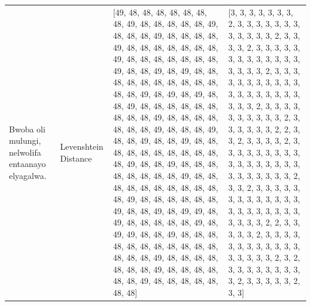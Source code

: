 \begin{tabular}{llll}
\multirow[t]{4}{*}{Bwoba oli mulungi, nelwolifa entaanayo elyagalwa.} & Levenshtein Distance & [49, 48, 48, 48, 48, 48, 48, 48, 49, 48, 48, 48, 48, 48, 49, 48, 48, 48, 49, 48, 48, 48, 48, 49, 48, 48, 48, 48, 48, 48, 48, 49, 48, 48, 48, 48, 48, 48, 48, 49, 48, 48, 49, 48, 49, 48, 48, 48, 48, 48, 48, 48, 48, 48, 48, 48, 48, 49, 48, 49, 48, 49, 48, 48, 49, 48, 48, 48, 48, 48, 48, 48, 48, 48, 49, 48, 48, 48, 48, 48, 48, 48, 49, 48, 48, 48, 49, 48, 48, 49, 48, 48, 49, 48, 48, 48, 48, 48, 48, 48, 48, 48, 48, 48, 49, 48, 48, 49, 48, 48, 48, 48, 48, 48, 48, 48, 49, 48, 48, 48, 48, 48, 48, 48, 48, 48, 48, 48, 49, 48, 48, 48, 48, 48, 48, 49, 48, 48, 49, 48, 49, 49, 48, 49, 48, 48, 48, 48, 48, 49, 48, 49, 49, 48, 48, 49, 48, 48, 48, 48, 48, 48, 48, 48, 48, 48, 48, 48, 48, 48, 49, 48, 48, 48, 48, 48, 48, 48, 49, 48, 48, 48, 48, 48, 48, 49, 48, 48, 48, 48, 48, 48, 48] & [3, 3, 3, 3, 3, 3, 3, 2, 3, 3, 3, 3, 3, 3, 3, 3, 3, 3, 3, 3, 2, 3, 3, 3, 3, 2, 3, 3, 3, 3, 3, 3, 3, 3, 3, 3, 3, 3, 3, 3, 3, 3, 3, 2, 3, 3, 3, 3, 3, 3, 3, 3, 3, 3, 3, 3, 3, 3, 3, 3, 3, 3, 3, 3, 3, 3, 2, 3, 3, 3, 3, 3, 3, 3, 3, 3, 3, 2, 3, 3, 3, 3, 3, 3, 2, 2, 3, 3, 2, 3, 3, 3, 3, 2, 3, 3, 3, 3, 3, 3, 3, 3, 3, 3, 3, 3, 3, 3, 3, 3, 3, 3, 3, 3, 3, 3, 3, 3, 2, 3, 3, 2, 3, 3, 3, 3, 3, 3, 3, 3, 3, 3, 3, 3, 3, 3, 3, 3, 3, 3, 3, 3, 3, 3, 3, 3, 3, 2, 2, 3, 3, 3, 3, 3, 2, 3, 3, 3, 3, 3, 3, 3, 3, 3, 3, 3, 3, 3, 3, 3, 3, 3, 2, 3, 2, 3, 3, 3, 3, 3, 3, 3, 3, 3, 2, 3, 3, 3, 3, 3, 2, 3, 3] \\

\end{tabular}
